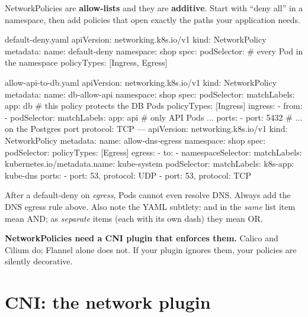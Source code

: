 \begin{keyidea}
NetworkPolicies are \textbf{allow-lists} and they are \textbf{additive}. Start
with ``deny all'' in a namespace, then add policies that open exactly the paths
your application needs.
\end{keyidea}

\begin{yamlcode}{default-deny.yaml}
apiVersion: networking.k8s.io/v1
kind: NetworkPolicy
metadata:
  name: default-deny
  namespace: shop
spec:
  podSelector: {}           # every Pod in the namespace
  policyTypes: [Ingress, Egress]
\end{yamlcode}

\begin{yamlcode}{allow-api-to-db.yaml}
apiVersion: networking.k8s.io/v1
kind: NetworkPolicy
metadata:
  name: db-allow-api
  namespace: shop
spec:
  podSelector:
    matchLabels: { app: db }           # this policy protects the DB Pods
  policyTypes: [Ingress]
  ingress:
    - from:
        - podSelector:
            matchLabels: { app: api }  # only API Pods ...
      ports:
        - port: 5432                    # ... on the Postgres port
          protocol: TCP
---
apiVersion: networking.k8s.io/v1
kind: NetworkPolicy
metadata:
  name: allow-dns-egress
  namespace: shop
spec:
  podSelector: {}
  policyTypes: [Egress]
  egress:
    - to:
        - namespaceSelector:
            matchLabels:
              kubernetes.io/metadata.name: kube-system
          podSelector:
            matchLabels:
              k8s-app: kube-dns
      ports:
        - { port: 53, protocol: UDP }
        - { port: 53, protocol: TCP }
\end{yamlcode}

\begin{warningbox}
After a default-deny on \emph{egress}, Pods cannot even resolve DNS. Always add
the DNS egress rule above. Also note the YAML subtlety: 
and  in the \emph{same} list item mean AND; as \emph{separate}
items (each with its own dash) they mean OR.
\end{warningbox}

\begin{warningbox}
\textbf{NetworkPolicies need a CNI plugin that enforces them.} Calico and Cilium
do; Flannel alone does not. If your plugin ignores them, your policies are
silently decorative.
\end{warningbox}

\section{CNI: the network plugin}

